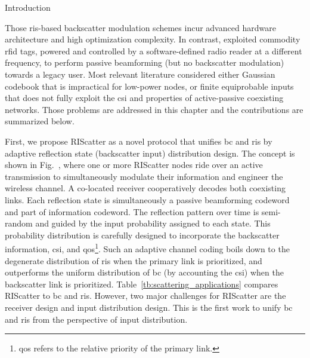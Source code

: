 \begin{section}{Introduction}
\begin{itemize}
	\end{itemize}
	Those \gls{ris}-based backscatter modulation schemes incur advanced hardware architecture and high optimization complexity.
	In contrast, \cite{Vardakis2023} exploited commodity \gls{rfid} tags, powered and controlled by a software-defined radio reader at a different frequency, to perform passive beamforming (but no backscatter modulation) towards a legacy user. \label{cm:2.5}
	Most relevant literature considered either Gaussian codebook \cite{Guo2019b,Ding2020,Long2020a,Zhou2019a,Wu2021a,Xu2021a,Yang2021a,Hu2021b} that is impractical for low-power nodes, or finite equiprobable inputs \cite{Yang2018,Liang2020,Han2021,Zhang2022,Liu2019d,Bereyhi2020,Xu2020b,Zhang2021d,Hua2022,Basar2020,Ma2020a,Yuan2021,Hu2021a} that does not fully exploit the \gls{csi} and properties of active-passive coexisting networks.
	Those problems are addressed in this chapter and the contributions are summarized below.

	First, we propose RIScatter as a novel protocol that unifies \gls{bc} and \gls{ris} by adaptive reflection state (backscatter input) distribution design.
	The concept is shown in Fig.~, where one or more RIScatter nodes ride over an active transmission to simultaneously modulate their information and engineer the wireless channel.
	A co-located receiver cooperatively decodes both coexisting links.
	Each reflection state is simultaneously a passive beamforming codeword and part of information codeword.
	The reflection pattern over time is semi-random and guided by the input probability assigned to each state.
	This probability distribution is carefully designed to incorporate the backscatter information, \gls{csi}, and \gls{qos}\footnote{\gls{qos} refers to the relative priority of the primary link.\label{fn:qos}}.
	Such an adaptive channel coding boils down to the degenerate distribution of \gls{ris} when the primary link is prioritized, and outperforms the uniform distribution of \gls{bc} (by accounting the \gls{csi}) when the backscatter link is prioritized.
	Table~\ref{tb:scattering_applications} compares RIScatter to \gls{bc} and \gls{ris}.
	However, two major challenges for RIScatter are the receiver design and input distribution design.
	This is the first work to unify \gls{bc} and \gls{ris} from the perspective of input distribution.


\end{section}
